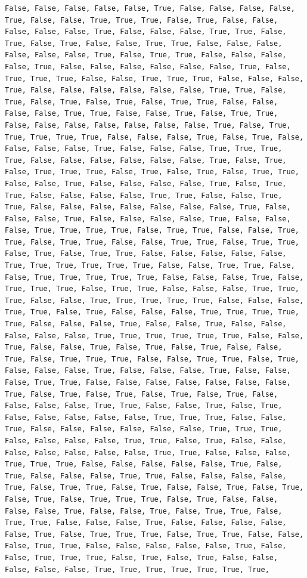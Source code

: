 \documentclass[
  letterpaper,
  DIV=11,
  numbers=noendperiod]{scrartcl}
\begin{document}
\begin{verbatim}
False, False, False, False, False, True, False, False, False, False, True, False, False, True, True, True, False, True, False, False, False, False, False, True, False, False, False, True, True, False, True, False, True, False, False, True, True, False, False, False, False, False, False, True, False, True, True, False, False, False, False, True, False, False, False, False, False, False, True, False, True, True, True, False, False, True, True, True, False, False, False, True, False, False, False, False, False, False, True, True, False, True, False, True, False, True, False, True, True, False, False, False, False, True, True, False, False, True, False, True, True, False, False, False, False, False, False, False, True, False, True, True, True, True, True, False, False, False, True, False, True, False, False, False, False, True, False, False, False, True, True, True, True, False, False, False, False, False, False, True, False, True, False, True, True, True, False, True, False, True, False, True, True, False, False, True, False, False, False, False, True, False, True, True, False, False, False, False, True, True, False, False, True, True, False, False, False, False, False, False, False, True, False, False, False, True, False, False, False, False, True, False, False, False, True, True, True, True, False, True, True, False, False, True, True, False, True, True, False, False, True, True, False, True, True, False, True, False, True, True, False, False, False, False, False, True, True, True, True, True, True, False, False, True, True, False, False, True, True, True, True, True, False, False, False, True, False, True, True, True, False, True, True, False, False, False, True, True, True, False, False, True, True, True, True, True, False, False, False, True, True, False, True, False, False, False, True, True, True, True, True, False, False, False, True, False, False, True, False, False, False, False, False, True, True, True, True, True, True, False, False, True, False, False, True, False, True, False, True, False, False, True, False, True, True, True, False, False, True, True, False, True, False, False, False, True, False, False, False, True, False, False, False, True, True, False, False, False, False, False, False, False, True, False, True, False, True, False, True, False, True, False, False, False, False, True, True, False, False, True, False, True, False, False, False, False, False, True, True, True, False, False, True, False, False, False, False, False, False, True, True, True, False, False, False, False, True, True, False, True, False, False, False, False, False, False, False, True, True, False, False, False, True, True, True, False, False, False, False, False, True, False, True, False, False, False, True, True, False, False, False, False, True, False, True, True, False, True, False, False, True, False, True, False, True, False, True, True, True, False, True, False, False, False, False, True, False, False, True, False, True, True, False, True, True, False, False, False, True, False, False, False, False, False, True, False, True, True, True, False, True, True, False, False, False, True, True, False, False, False, False, False, True, False, False, True, True, True, False, True, False, True, False, False, False, False, False, True, True, True, True, True, True, True, 
\end{verbatim}
\end{document}
